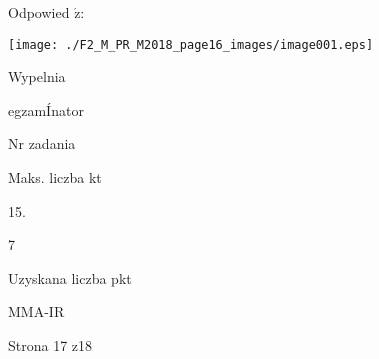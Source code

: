 \documentclass[a4paper,12pt]{article}
\begin{document}
Odpowied $\acute{\mathrm{z}}$:
\begin{center}
\texttt{[image: ./F2\_M\_PR\_M2018\_page16\_images/image001.eps]}
\end{center}
Wypelnia

egzamÍnator

Nr zadania

Maks. liczba kt

15.

7

Uzyskana liczba pkt

MMA-IR

Strona 17 z18
\end{document}
